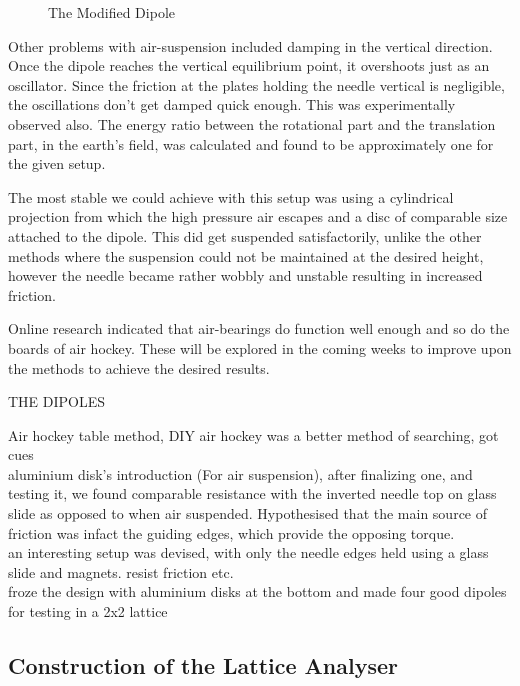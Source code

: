 \begin{enumerate}
\begin{figure}[bth]
\begin{center}
						\end{center}
					\caption[The Modified Dipole]{The Modified Dipole}
					\label{theLightDipole}
					\end{figure}						
					\par
					Other problems with air-suspension included damping in the vertical direction. Once the dipole reaches the vertical equilibrium point, it overshoots just as an oscillator. Since the friction at the plates holding the needle vertical is negligible, the oscillations don't get damped quick enough. This was experimentally observed also. The energy ratio between the rotational part and the translation part, in the earth's field, was calculated and found to be approximately one for the given setup.
					\par
					The most stable we could achieve with this setup was using a cylindrical projection from which the high pressure air escapes and a disc of comparable size attached to the dipole. This did get suspended satisfactorily, unlike the other methods where the suspension could not be maintained at the desired height, however the needle became rather wobbly and unstable resulting in increased friction.
					\par
					Online research indicated that air-bearings do function well enough and so do the boards of air hockey. These will be explored in the coming weeks to improve upon the methods to achieve the desired results.
					\par
					THE DIPOLES
					\par
					Air hockey table method, DIY air hockey was a better method of searching, got cues
					\\
					aluminium disk's introduction (For air suspension), after finalizing one, and testing it, we found comparable resistance with the inverted needle top on glass slide as opposed to when air suspended. Hypothesised that the main source of friction was infact the guiding edges, which provide the opposing torque.
					\\
					an interesting setup was devised, with only the needle edges held using a glass slide and magnets. resist friction etc. 
					\\
					froze the design with aluminium disks at the bottom and made four good dipoles for testing in a 2x2 lattice
		\end{enumerate}
	\subsection{Construction of the Lattice Analyser}
